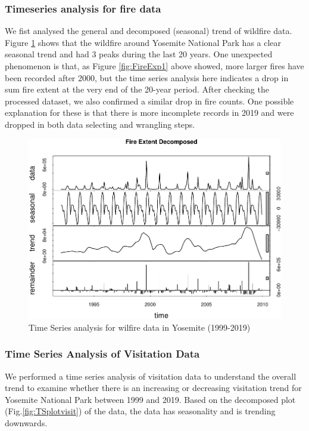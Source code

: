 \documentclass[
  12pt,
]{article}
\begin{document}
\hypertarget{timeseries-analysis-for-fire-data}{%
\subsubsection{Timeseries analysis for fire data}\label{timeseries-analysis-for-fire-data}}

We fist analysed the general and decomposed (seasonal) trend of wildfire data.
Figure \ref{fig:TSplotfire} shows that the wildfire around Yosemite National Park has a clear seasonal trend and had 3 peaks during the last 20 years. One unexpected phenomenon is that, as Figure \ref{fig:FireExp1} above showed, more larger fires have been recorded after 2000, but the time series analysis here indicates a drop in sum fire extent at the very end of the 20-year period. After checking the processed dataset, we also confirmed a similar drop in fire counts. One possible explanation for these is that there is more incomplete records in 2019 and were dropped in both data selecting and wrangling steps.

\begin{figure}

{\centering \includegraphics[width=0.6\linewidth]{CodeFinal_files/figure-latex/TSplotfire-1} 

}

\caption{Time Series analysis for wilfire data in Yosemite (1999-2019)}\label{fig:TSplotfire}
\end{figure}

\hypertarget{time-series-analysis-of-visitation-data}{%
\subsubsection{Time Series Analysis of Visitation Data}\label{time-series-analysis-of-visitation-data}}

We performed a time series analysis of visitation data to understand the overall trend to examine whether there is an increasing or decreasing visitation trend for Yosemite National Park between 1999 and 2019. Based on the decomposed plot (Fig.\ref{fig:TSplotvisit}) of the data, the data has seasonality and is trending downwards.
\end{document}

